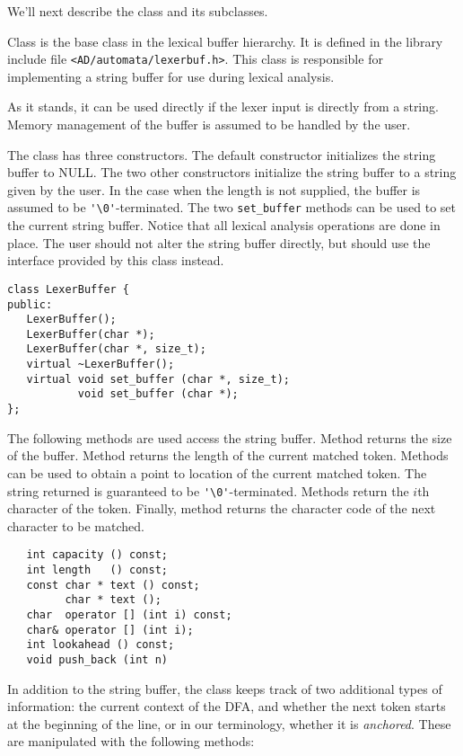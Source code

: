 We'll next describe the class  and its subclasses.

Class  
is the base class in the lexical buffer hierarchy.
It is defined in the library include file \verb|<AD/automata/lexerbuf.h>|.
This class is responsible for implementing a string buffer for use
during lexical analysis.   

As it stands, it can be used directly if the lexer input is directly
from a string.  Memory management of the buffer is assumed to be handled
by the user. 

The class  has three constructors.  The default
constructor initializes the string buffer to NULL.  The two
other constructors initialize the string buffer to a string given
by the user.  In the case when the length is not supplied, the buffer
is assumed to be \verb|'\0'|-terminated.  The two \verb|set_buffer| methods
can be used to set the current string buffer.  Notice that
all lexical analysis operations are done in place.  The user should
not alter the string buffer directly, but should use the interface
provided by this class instead.

\begin{verbatim}
class LexerBuffer {
public:
   LexerBuffer();    
   LexerBuffer(char *);    
   LexerBuffer(char *, size_t);    
   virtual ~LexerBuffer();
   virtual void set_buffer (char *, size_t);
           void set_buffer (char *);
};
\end{verbatim}

The following methods are used access the string buffer.
Method  returns the size of the buffer.  Method
 returns the length of the current matched token.
Methods  can be used to obtain a point to location
of the current matched token.  The string returned is guaranteed
to be \verb|'\0'|-terminated.  Methods  return
the $i$th character of the token.  Finally, method 
returns the character code of the next character to be matched.

\begin{verbatim}
   int capacity () const;
   int length   () const;
   const char * text () const;
         char * text ();
   char  operator [] (int i) const;
   char& operator [] (int i);
   int lookahead () const;
   void push_back (int n) 
\end{verbatim}

In addition to the string buffer, the class  keeps
track of two additional types of information: the current context
of the DFA, and whether the next token starts at the
beginning of the line, or in our terminology, whether it is
{\em anchored}.  These are manipulated with the following methods:

